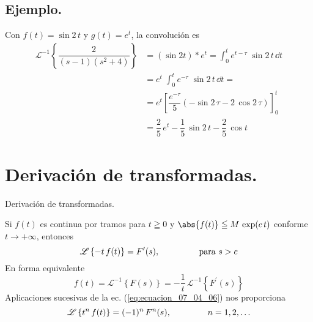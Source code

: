 \subsection*{Ejemplo.}
Con $f(t) = \sin 2 \, t$ y $g(t) = e^{t}$, la convolución es
\begin{align*}
\mathscr{L}^{-1} \left\{ \dfrac{2}{(s-1)(s^{2} + 4)} \right\} &= (\sin 2t) * e^{t} = \int_{0}^{t} e^{t - \tau} \; \sin 2 \, t \, \dd t \\
&= e^{t} \; \int_{0}^{t} e^{-\tau} \; \sin 2 \, t \, \dd t = \\
&= e^{t} \left[ \dfrac{e^{-\tau}}{5} (- \sin 2 \, \tau - 2 \, \cos 2 \, \tau) \right]_{0}^{t} \\
&= \dfrac{2}{5} \, e^{t} - \dfrac{1}{5} \, \sin 2 \, t - \dfrac{2}{5} \, \cos t
\end{align*}
\section{Derivación de transformadas.}
\begin{teo}{Derivación de transformadas.}

Si $f(t)$ es continua por tramos para $t \geqq 0$ y $\abs{f(t)} \leqq M \, \exp(c \, t)$ conforme $t \to +\infty$, entonces
\begin{equation}
\mathscr{L} \left\{ -t \, f(t) \right\} = F^{\prime}(s), \hspace{1.5cm} \mbox{ para } s > c
\label{eq:ecuacion_07_04_06}
\end{equation}
En forma equivalente
\begin{equation}
f(t) = \mathscr{L}^{-1} \left\{ F(s) \right\} = - \dfrac{1}{t} \, \mathscr{L}^{-1} \left\{ F^{\prime}(s) \right\}
\label{eq:ecuacion_07_04_07}
\end{equation}
Aplicaciones sucesivas de la ec. (\ref{eq:ecuacion_07_04_06}) nos proporciona
\begin{equation}
\mathscr{L} \left\{ t^{n} \, f(t) \right\} = (-1)^{n} \, F^{n}(s), \hspace{1.5cm} n = 1, 2, \ldots
\label{eq:ecuacion_07_04_08}
\end{equation}
\end{teo}
